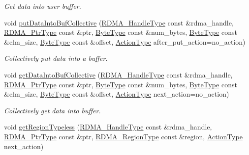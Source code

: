\begin{DoxyCompactItemize}
\begin{DoxyCompactList}\small\item\em Get data into user buffer. \end{DoxyCompactList}\item 
void \hyperlink{structvt_1_1rdma_1_1_r_d_m_a_manager_a9f5bbbbdc2d6cca20f3bd5a259ecaf62}{put\+Data\+Into\+Buf\+Collective} (\hyperlink{namespacevt_a10442579ec4e7ebef223818e64bcf908}{R\+D\+M\+A\+\_\+\+Handle\+Type} const \&rdma\+\_\+handle, \hyperlink{namespacevt_a9e2c953286c7616f7c218e9951790776}{R\+D\+M\+A\+\_\+\+Ptr\+Type} const \&ptr, \hyperlink{namespacevt_aab8d55968084610ce3b17057981e9300}{Byte\+Type} const \&num\+\_\+bytes, \hyperlink{namespacevt_aab8d55968084610ce3b17057981e9300}{Byte\+Type} const \&elm\+\_\+size, \hyperlink{namespacevt_aab8d55968084610ce3b17057981e9300}{Byte\+Type} const \&offset, \hyperlink{namespacevt_ae0a5a7b18cc99d7b732cb4d44f46b0f3}{Action\+Type} after\+\_\+put\+\_\+action=no\+\_\+action)
\begin{DoxyCompactList}\small\item\em Collectively put data into a buffer. \end{DoxyCompactList}\item 
void \hyperlink{structvt_1_1rdma_1_1_r_d_m_a_manager_a68bf3378ec4132a81b728c180aa63686}{get\+Data\+Into\+Buf\+Collective} (\hyperlink{namespacevt_a10442579ec4e7ebef223818e64bcf908}{R\+D\+M\+A\+\_\+\+Handle\+Type} const \&rdma\+\_\+handle, \hyperlink{namespacevt_a9e2c953286c7616f7c218e9951790776}{R\+D\+M\+A\+\_\+\+Ptr\+Type} const \&ptr, \hyperlink{namespacevt_aab8d55968084610ce3b17057981e9300}{Byte\+Type} const \&num\+\_\+bytes, \hyperlink{namespacevt_aab8d55968084610ce3b17057981e9300}{Byte\+Type} const \&elm\+\_\+size, \hyperlink{namespacevt_aab8d55968084610ce3b17057981e9300}{Byte\+Type} const \&offset, \hyperlink{namespacevt_ae0a5a7b18cc99d7b732cb4d44f46b0f3}{Action\+Type} next\+\_\+action=no\+\_\+action)
\begin{DoxyCompactList}\small\item\em Collectively get data into buffer. \end{DoxyCompactList}\item 
void \hyperlink{structvt_1_1rdma_1_1_r_d_m_a_manager_a108e405a633745d46c2d68a1a0727b7c}{get\+Region\+Typeless} (\hyperlink{namespacevt_a10442579ec4e7ebef223818e64bcf908}{R\+D\+M\+A\+\_\+\+Handle\+Type} const \&rdma\+\_\+handle, \hyperlink{namespacevt_a9e2c953286c7616f7c218e9951790776}{R\+D\+M\+A\+\_\+\+Ptr\+Type} const \&ptr, \hyperlink{structvt_1_1rdma_1_1_r_d_m_a_manager_aafc574f533ebf5b34c1389ef504448bf}{R\+D\+M\+A\+\_\+\+Region\+Type} const \&region, \hyperlink{namespacevt_ae0a5a7b18cc99d7b732cb4d44f46b0f3}{Action\+Type} next\+\_\+action)

\end{DoxyCompactItemize}
